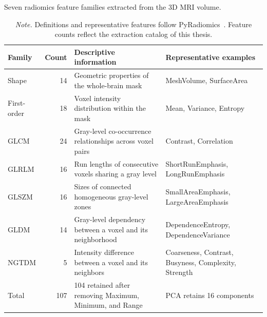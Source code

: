 \begin{table}[H]
\centering\small
\caption{Seven radiomics feature families extracted from the 3D MRI volume.}
\label{tab:radiomics-groups}
\begin{tabularx}{\linewidth}{@{}L{2.7cm}r Y Y@{}}
\toprule
Family & Count & Descriptive information & Representative examples \\
\midrule
Shape & 14 & Geometric properties of the whole-brain mask & MeshVolume, SurfaceArea \\
First-order & 18 & Voxel intensity distribution within the mask & Mean, Variance, Entropy \\
GLCM & 24 & Gray-level co-occurrence relationships across voxel pairs & Contrast, Correlation \\
GLRLM & 16 & Run lengths of consecutive voxels sharing a gray level & ShortRunEmphasis, LongRunEmphasis \\
GLSZM & 16 & Sizes of connected homogeneous gray-level zones & SmallAreaEmphasis, LargeAreaEmphasis \\
GLDM & 14 & Gray-level dependency between a voxel and its neighborhood & DependenceEntropy, DependenceVariance \\
NGTDM & 5 & Intensity difference between a voxel and its neighbors & Coarseness, Contrast, Busyness, Complexity, Strength \\
\midrule
Total & 107 & 104 retained after removing Maximum, Minimum, and Range & PCA retains 16 components \\
\bottomrule
\end{tabularx}
\caption*{\textit{Note.} Definitions and representative features follow PyRadiomics~\cite{pyradiomicsfeatures}. Feature counts reflect the extraction catalog of this thesis.}
\end{table}
